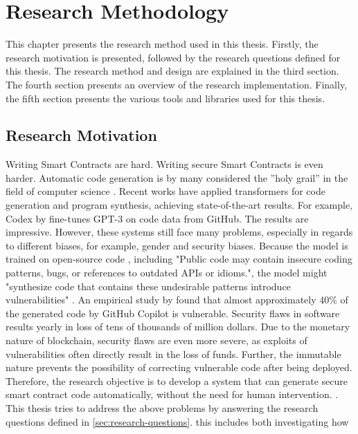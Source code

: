 \chapter{Research Methodology}
\label{chap:method}
This chapter presents the research method used in this thesis. Firstly, the research motivation is presented, followed by the research questions defined for this thesis. The research method and design are explained in the third section. The fourth section presents an overview of the research implementation. Finally, the fifth section presents the various tools and libraries used for this thesis.

\section{Research Motivation}
Writing Smart Contracts are hard. Writing secure Smart Contracts is even harder. Automatic code generation is by many considered the ”holy grail” in the field of computer science \cite{PGL-010}. Recent works have applied transformers for code generation and program synthesis, achieving state-of-the-art results. For example, Codex by \cite{chen2021codex} fine-tunes GPT-3 \cite{brown2020language} on code data from GitHub. The results are impressive. However, these systems still face many problems, especially in regards to different biases, for example, gender and security biases. Because the model is trained on open-source code \cite{chen2021codex}, including "Public code may contain insecure coding patterns, bugs, or references to outdated APIs or idioms.", the model might "synthesize code that contains these undesirable patterns introduce vulnerabilities" \cite{copilot}. An empirical study by \textcite{pearce2021asleep} found that almost approximately 40\% of the generated code by GitHub Copilot is vulnerable. Security flaws in software results yearly in loss of tens of thousands of million dollars. Due to the monetary nature of blockchain, security flaws are even more severe, as exploits of vulnerabilities often directly result in the loss of funds. Further, the immutable nature prevents the possibility of correcting vulnerable code after being deployed. Therefore, the research objective is to develop a system that can generate secure smart contract code automatically, without the need for human intervention. . This thesis tries to address the above problems by answering the research questions defined in \cref{sec:research-questions}. this includes both investigating how 


